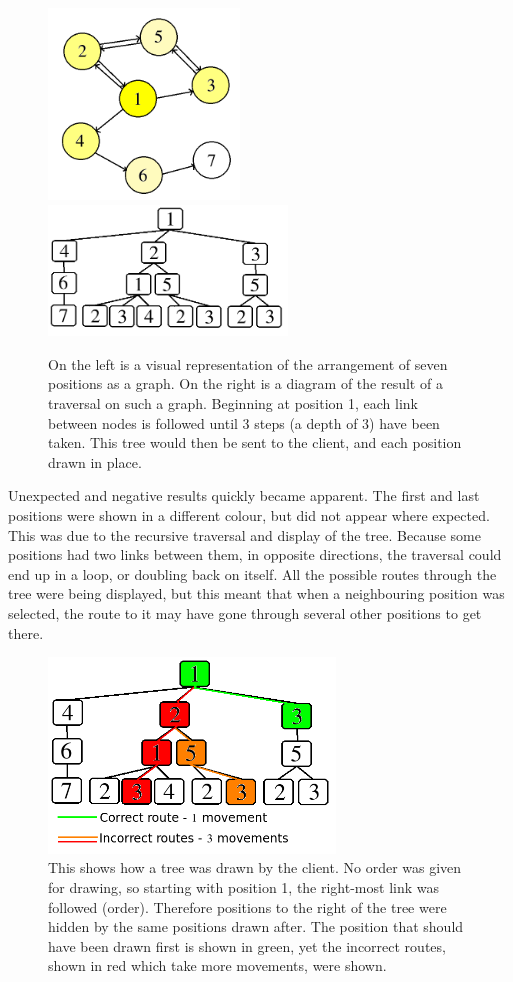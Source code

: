 \begin{figure}[h]
\centering
\includegraphics[width=2in]{Images/3/graph}
\includegraphics[width=2.5in]{Images/3/tree-1}
\caption{On the left is a visual representation of the arrangement of seven positions as a graph. On the right is a diagram of the result of a traversal on such a graph. Beginning at position 1, each link between nodes is followed until 3 steps (a depth of 3) have been taken. This tree would then be sent to the client, and each position drawn in place.}
\label{3_recursive_search}
\end{figure}

Unexpected and negative results quickly became apparent. The first and last positions were shown in a different colour, but did not appear where expected. This was due to the recursive traversal and display of the tree. Because some positions had two links between them, in opposite directions, the traversal could end up in a loop, or doubling back on itself. All the possible routes through the tree were being displayed, but this meant that when a neighbouring position was selected, the route to it may have gone through several other positions to get there.

\begin{figure}[h]
\centering
\includegraphics[width=3in]{Images/3/tree-1-example-1}
\caption{This shows how a tree was drawn by the client. No order was given for drawing, so starting with position 1, the right-most link was followed (order). Therefore positions to the right of the tree were hidden by the same positions drawn after. The position that should have been drawn first is shown in green, yet the incorrect routes, shown in red which take more movements, were shown.}
\label{3_recursive_search_wrong}
\end{figure}


